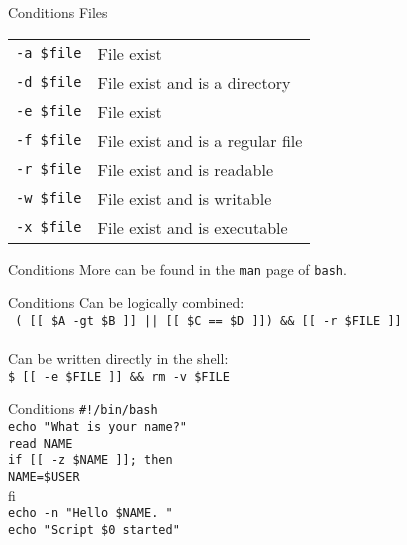 \documentclass{beamer}
\let\tt\texttt
\begin{document}
\begin{frame}{Conditions}
        Files      \\
        \begin{tabular}{l l}
                \tt{-a \$file}    &   File exist                    \\
                \tt{-d \$file}    &   File exist and is a directory \\
                \tt{-e \$file}    &   File exist                    \\
                \tt{-f \$file}    &   File exist and is a regular file  \\
                \tt{-r \$file}    &   File exist and is readable    \\
                \tt{-w \$file}    &   File exist and is writable    \\
                \tt{-x \$file}    &   File exist and is executable  \\
        \end{tabular}
\end{frame}

\begin{frame}{Conditions}
        More can be found in the \tt{man} page of \tt{bash}.
\end{frame}

\begin{frame}{Conditions}
        Can be logically combined: \\
        \tt{ ( [[ \$A -gt \$B ]] || [[ \$C == \$D ]]) \&\& [[ -r \$FILE ]] } \\
        \quad \\
        Can be written directly in the shell:   \\
        \tt{\$ [[ -e \$FILE ]] \&\& rm -v \$FILE} \\
\end{frame}

\begin{frame}{Conditions}
        \tt{\#!/bin/bash}                   \\
        \tt{echo "What is your name?"}      \\
        \tt{read NAME}                      \\
        \tt{if [[ -z \$NAME ]]; then}       \\
        \quad \tt{NAME=\$USER}              \\
        fi                                  \\
        \tt{echo -n "Hello \$NAME. "}       \\
        \tt{echo "Script \$0 started"}      \\
\end{frame}
\end{document}

